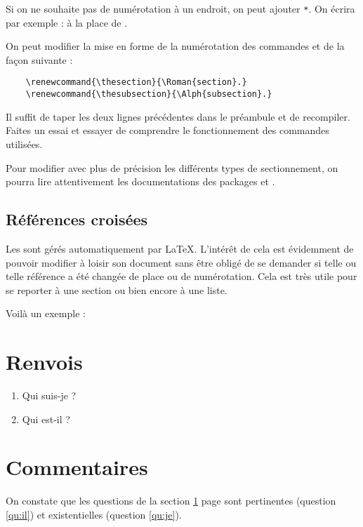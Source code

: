 \begin{info}
    Si on ne souhaite pas de numérotation à un endroit, on peut ajouter \verb!*!. On écrira par exemple :
     à la place de .
\end{info}

On peut modifier la mise en forme de la numérotation des commandes  et  de la façon suivante :
\begin{Verbatim}
    \renewcommand{\thesection}{\Roman{section}.}
    \renewcommand{\thesubsection}{\Alph{subsection}.}
\end{Verbatim}

Il suffit de taper les deux lignes précédentes dans le préambule et de recompiler. Faites un essai et essayer de comprendre le fonctionnement des commandes utilisées.

\begin{info}
    Pour modifier avec plus de précision les différents types de sectionnement, on pourra lire attentivement les documentations des packages  et .
\end{info}

\subsection{Références croisées}

Les  sont gérés automatiquement par \LaTeX. L'intérêt de cela est évidemment de pouvoir modifier à loisir son document sans être obligé de se demander si telle ou telle référence a été changée de place ou de numérotation. Cela est très utile pour se reporter à une section ou bien encore à une liste.

Voilà un exemple :\bigskip

{\NewFont\reset
\begin{SideBySideExample}
    \section{Renvois}\label{sec}
        \begin{enumerate}
            \item Qui suis-je ?\label{qu:je}
            \item Qui est-il ?\label{qu:il}
        \end{enumerate}

    \section{Commentaires}
    On constate que les questions de la
    section \ref{sec} page \pageref{sec}
    sont pertinentes (question \ref{qu:il})
    et existentielles (question \ref{qu:je}).
\end{SideBySideExample}
\unreset
}\bigskip

